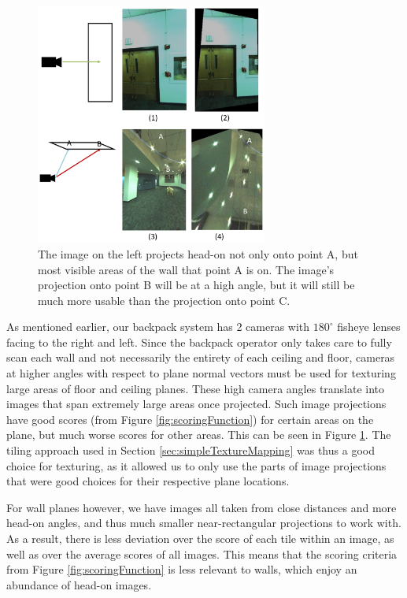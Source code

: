 \documentclass[10pt,twocolumn,letterpaper]{article}
\begin{document}
\begin{figure}
  \centering
  \includegraphics[width=3in]{highCameraAngle.pdf}
  \caption{The image on the left projects head-on not only onto point A, but most visible areas of the wall that point A is on. The image's projection onto point B will be at a high angle, but it will still be much more usable than the projection onto point C.}
  \label{fig:highCameraAngle}
\end{figure}


As mentioned earlier, our backpack system has 2 cameras with
$180^\circ$ fisheye lenses facing to the right and left. Since the
backpack operator only takes care to fully scan each wall and not
necessarily the entirety of each ceiling and floor, cameras at higher
angles with respect to plane normal vectors must be used for texturing
large areas of floor and ceiling planes. These high camera angles
translate into images that span extremely large areas once
projected. Such image projections have good scores (from Figure
\ref{fig:scoringFunction}) for certain areas on the plane, but much
worse scores for other areas. This can be seen in Figure
\ref{fig:highCameraAngle}. The tiling approach used in Section
\ref{sec:simpleTextureMapping} was thus a good choice for texturing,
as it allowed us to only use the parts of image projections that were
good choices for their respective plane locations.

For wall planes however, we have images all taken from close distances
and more head-on angles, and thus much smaller near-rectangular
projections to work with. As a result, there is less deviation over
the score of each tile within an image, as well as over the average
scores of all images. This means that the scoring criteria from Figure
\ref{fig:scoringFunction} is less relevant to walls, which enjoy an
abundance of head-on images.
\end{document}
